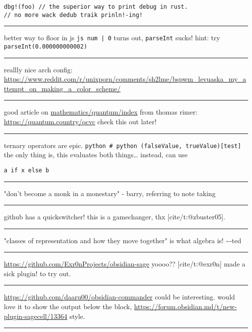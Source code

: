 \documentclass[letterpaper]{article}
\begin{document}
\begin{verbatim}
dbg!(foo) // the superior way to print debug in rust.
// no more wack dedub traik prinln!-ing!
\end{verbatim}

\noindent\rule{\textwidth}{0.5pt}

better way to floor in js \texttt{js num | 0} turns out, \texttt{parseInt} sucks!
hint: try \texttt{parseInt(0.000000000002)}

\noindent\rule{\textwidth}{0.5pt}

reallly nice arch config:
\url{https://www.reddit.com/r/unixporn/comments/sh2lme/bspwm\_levuaska\_my\_attempt\_on\_making\_a\_color\_scheme/}

\noindent\rule{\textwidth}{0.5pt}

good article on
\href{mathematics/quantum/index.org}{mathematics/quantum/index} from
thomas rimer: \url{https://quantum.country/qcvc} check this out later!

\noindent\rule{\textwidth}{0.5pt}

ternary operators are epic.
\texttt{python \# python (falseValue, trueValue)[test]} the only thing is, this
evaluates both things\ldots{} instead, can use

\begin{verbatim}
a if x else b
\end{verbatim}

\noindent\rule{\textwidth}{0.5pt}

"don't become a monk in a monestary" - barry, referring to note taking

\noindent\rule{\textwidth}{0.5pt}

github has a quickswitcher! this is a gamechanger, thx
[cite/t:@zbuster05].

\noindent\rule{\textwidth}{0.5pt}

"classes of representation and how they move together" is what algebra
is! \textasciitilde{}-ted

\noindent\rule{\textwidth}{0.5pt}

\url{https://github.com/Exr0nProjects/obsidian-sage} yoooo?? [cite/t:@exr0n]
made a sick plugin! to try out.

\noindent\rule{\textwidth}{0.5pt}

\url{https://github.com/daaru00/obsidian-commander} could be interesting.
would love it to show the output below the block,
\url{https://forum.obsidian.md/t/new-plugin-sagecell/13364} style.

\noindent\rule{\textwidth}{0.5pt}
\end{document}
